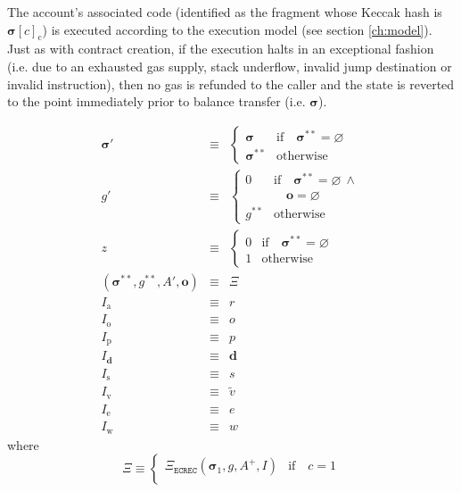 \documentclass[9pt,oneside]{amsart}
\begin{document}
\begin{multicols}{2}
The account's associated code (identified as the fragment whose Keccak hash is $\boldsymbol{\sigma}[c]_{\mathrm{c}}$) is executed according to the execution model (see section \ref{ch:model}). Just as with contract creation, if the execution halts in an exceptional fashion (i.e. due to an exhausted gas supply, stack underflow, invalid jump destination or invalid instruction), then no gas is refunded to the caller and the state is reverted to the point immediately prior to balance transfer (i.e. $\boldsymbol{\sigma}$).

\begin{eqnarray}
\boldsymbol{\sigma}' & \equiv & \begin{cases}
\boldsymbol{\sigma} & \text{if} \quad \boldsymbol{\sigma}^{**} = \varnothing \\
\boldsymbol{\sigma}^{**} & \text{otherwise}
\end{cases} \\
g' & \equiv & \begin{cases}
0 & \text{if} \quad \boldsymbol{\sigma}^{**} = \varnothing \ \wedge \\
&\quad \mathbf{o} = \varnothing \\
g^{**} & \text{otherwise}
\end{cases} \\ \nonumber
z & \equiv & \begin{cases}
0 & \text{if} \quad \boldsymbol{\sigma}^{**} = \varnothing \\
1 & \text{otherwise}
\end{cases} \\
(\boldsymbol{\sigma}^{**}, g^{**}, A', \mathbf{o}) & \equiv & \Xi\\
I_{\mathrm{a}} & \equiv & r \\
I_{\mathrm{o}} & \equiv & o \\
I_{\mathrm{p}} & \equiv & p \\
I_{\mathbf{d}} & \equiv & \mathbf{d} \\
I_{\mathrm{s}} & \equiv & s \\
I_{\mathrm{v}} & \equiv & \tilde{v} \\
I_{\mathrm{e}} & \equiv & e \\
I_{\mathrm{w}} & \equiv & w
\end{eqnarray}
\nopagebreak[1]where
\begin{equation}
\Xi \equiv \begin{cases}
\Xi_{\mathtt{ECREC}}    (\boldsymbol{\sigma}_1, g, A^+, I) & \text{if} \quad c = 1 \\

\end{cases}
\end{equation}
\end{multicols}
\end{document}

